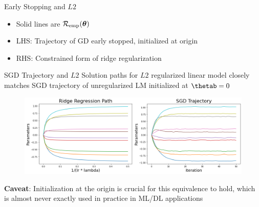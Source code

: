 \documentclass[11pt,compress,t,notes=noshow, xcolor=table]{beamer}
\begin{document}
\begin{vbframe}{Early Stopping and $L2$ }
\begin{itemize}
\item Solid lines are $\mathcal{R}_{\text{emp}}(\bm{\theta})$ 
\item LHS: Trajectory of GD early stopped, initialized at origin
\item RHS: Constrained form of ridge regularization
\end{itemize}

\end{vbframe}

\begin{vbframe}{SGD Trajectory and $L2$ }
Solution paths for $L2$ regularized linear model closely matches SGD trajectory of unregularized LM initialized at $\thetab=0$ 
\lz
  \begin{figure}
    \centering
      {\includegraphics{figure_man/ridge-vs-sgd-path.png}}
  \end{figure}

\textbf{Caveat}: Initialization at the origin is crucial for this equivalence to hold, which is almost never exactly used in practice in ML/DL applications

\end{vbframe}

\endlecture
\end{document}
